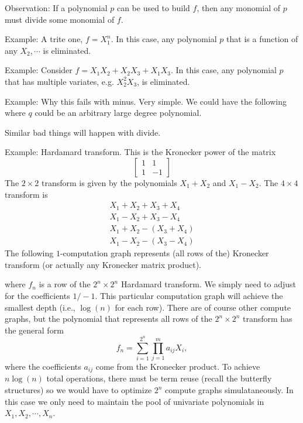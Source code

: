 \documentclass[12pt]{article}
\begin{document}
Observation: If a polynomial $p$ can be used to build $f$, then any monomial of
$p$ must divide some monomial of $f$. 

Example: A trite one, $f = X_1^n$. In this case, any polynomial $p$ that is a
function of any $X_2, \cdots$ is eliminated.

Example: Consider $f = X_1 X_2 + X_2 X_3 + X_1 X_3$. In this case, any
polynomial $p$ that has multiple variates, e.g. $X_2^2 X_3$, is eliminated.

Example: Why this fails with minus. Very simple. We could have the following
where $q$ could be an arbitrary large degree polynomial.

Similar bad things will happen with divide.

Example: Hardamard transform. This is the Kronecker power of the matrix
\[
\left[
    \begin{array}{cc}
        1 & 1 \\ 1 & -1
    \end{array}
\right]
\]
The $2 \times 2$ transform is given by the polynomials $X_1 + X_2$ and
$X_1 - X_2$. The $4 \times 4$ transform is 
\begin{eqnarray}
    X_1 + X_2 + X_3 + X_4 \\
    X_1 - X_2 + X_3 - X_4 \\
    X_1 + X_2 - (X_3 + X_4) \\
    X_1 - X_2 - (X_3 - X_4) 
\end{eqnarray}
The following $1$-computation graph represents (all rows of the) Kronecker transform 
(or actually any Kronecker matrix product). 
where $f_n$ is a row of the $2^n \times 2^n$ Hardamard transform. 
We simply need to adjust for the coefficients $1/-1$. 
This particular computation graph will achieve the smallest depth
(i.e., $\log(n)$ for each row).
There are of course other compute graphs, but the polynomial that represents all
rows of the $2^n \times 2^n$ transform has the general form
\[
    f_n = \sum_{i=1}^{2^n} \prod_{j=1}^m a_{ij} X_i, 
\]
where the coefficients $a_{ij}$ come from the Kronecker product. 
To achieve $n \log(n)$ total operations, there must be term reuse (recall the
butterfly structures) so we would have to optimize $2^n$ compute graphs
simulataneously. 
In this case we only need to maintain the pool of univariate polynomials in
$X_1, X_2, \cdots, X_n$. 
\end{document}
